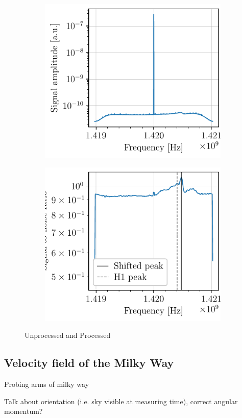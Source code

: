 \begin{figure}
    \begin{subfigure}{0.49\textwidth}
        \centering
        \includegraphics[scale=1]{figures/raw_signal.pdf}
        \caption{}
        \label{fig:raw_signal}
    \end{subfigure}
    \begin{subfigure}{0.49\textwidth}
        \centering
        \includegraphics[scale=1]{figures/clean_signal.pdf}
        \caption{}
        \label{fig:clean_signal}
    \end{subfigure}
    \caption{Unprocessed and Processed}
    \label{fig:process_example}
\end{figure}
\subsection{Velocity field of the Milky Way}
Probing arms of milky way

Talk about orientation (i.e. sky visible at measuring time), correct angular momentum?
